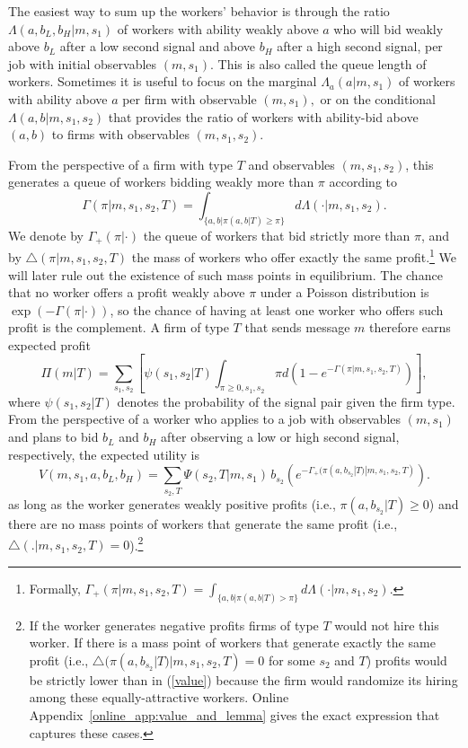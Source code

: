 \documentclass[12pt]{article}
\begin{document}
The easiest way to sum up the workers' behavior is through the ratio $\Lambda(a,b_{L},b_{H}|m,s_{1})$ of workers with ability weakly above $a$ who will bid weakly above $b_{L}$ after a low second signal and above $b_{H}$ after a high second signal, per job with initial observables $(m,s_{1})$. This is also called the queue length of workers. Sometimes it is useful to focus on the marginal $\Lambda_{a}(a|m,s_{1})$ of workers with ability above $a$ per firm with observable $(m,s_{1}),$ or on the conditional $\Lambda(a,b|m,s_{1},s_{2})$ that provides the ratio of workers with ability-bid above $(a,b)$ to firms with observables $(m,s_{1},s_{2}).$

From the perspective of a firm with type $T$ and observables $(m,s_{1},s_{2})$, this generates a queue of workers bidding weakly more than $\pi$ according to
\begin{equation*}
\Gamma(\pi|m,s_{1},s_{2},T)=\int_{\{a,b|\pi(a,b|T)\geq\pi\}}d\Lambda(\cdot|m,s_{1},s_{2}).
\end{equation*}%
We denote by $\Gamma_{+}(\pi|\cdot)$ the queue of workers that bid strictly more than $\pi$, and by $\bigtriangleup(\pi|m,s_{1},s_{2},T)$ the mass of workers who offer exactly the same profit.\footnote{Formally, $\Gamma_{+}(\pi|m,s_{1},s_{2},T)=\int_{\{a,b|\pi(a,b|T)>\pi\}}d\Lambda(\cdot|m,s_{1},s_{2})$.} We will later rule out the existence of such mass points in equilibrium. The chance that no worker offers a profit weakly above $\pi$ under a Poisson distribution is $\exp(-\Gamma(\pi|\cdot))$, so the chance of having at least one worker who offers such profit is the complement. A firm of type $T$ that sends message $m$ therefore earns expected profit
\begin{equation}
\Pi (m|T)=\sum_{s_{1},s_{2}}\left[ \psi (s_{1},s_{2}|T)\int_{\pi \geq 
0,s_{1},s_{2}}\pi d(1-e^{-\Gamma (\pi |m,s_{1},s_{2},T)})\right] ,
\label{profits}
\end{equation}%
where $\psi(s_{1},s_{2}|T)$ denotes the probability of the signal pair given the firm type. 
From the perspective of a worker who applies to a job with observables $(m,s_1)$
and plans to bid $b_L$ and $b_H$ after observing a low or high second signal,
respectively, the expected utility is
\begin{equation}
V(m,s_{1},a,b_{L},b_{H})=\sum_{s_{2},T}\Psi(s_{2},T|m,s_{1})\,b_{s_{2}} \left(
  e^{-\Gamma_{+}(\pi(a,b_{s_{2}}|T)|m,s_{1},s_{2},T)} \right) .
\label{value}
\end{equation}
as long as the worker generates weakly positive profits (i.e., $\pi (a,b_{s_2}|T)\geq 0$) and there are no mass points of workers that generate the same profit (i.e., $\bigtriangleup (.|m,s_{1},s_{2},T)=0$).\footnote{
If the worker generates negative profits firms of type $T$ would not hire this worker. If there is a mass point of workers that generate exactly the same profit (i.e., $\bigtriangleup (\pi
(a,b_{s_2}|T)|m,s_{1},s_{2},T)=0$ for some $s_2$ and $T$) profits would be strictly lower than in (\ref{value}) because the firm would randomize its hiring among these equally-attractive workers. Online Appendix~\ref{online_app:value_and_lemma} gives the exact expression that captures these cases.}
\end{document}
